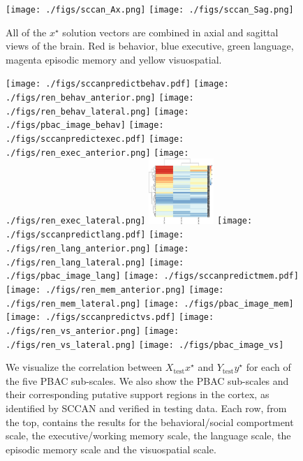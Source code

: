\documentclass[preprint,authoryear,12pt]{elsarticle}
\begin{document}
\begin{figure}[th] \centering
\texttt{[image: ./figs/sccan\_Ax.png]}
\texttt{[image: ./figs/sccan\_Sag.png]}
\caption{All of the $x^\star$ solution vectors are combined in axial and sagittal views of the brain.  Red is behavior, blue executive, green language, magenta episodic memory and yellow visuospatial.}
\label{fig:slices}
\end{figure}


\begin{figure}[th] \centering
\texttt{[image: ./figs/sccanpredictbehav.pdf]}
\texttt{[image: ./figs/ren\_behav\_anterior.png]}
\texttt{[image: ./figs/ren\_behav\_lateral.png]}
\texttt{[image: ./figs/pbac\_image\_behav]}
\texttt{[image: ./figs/sccanpredictexec.pdf]}
\texttt{[image: ./figs/ren\_exec\_anterior.png]}
\texttt{[image: ./figs/ren\_exec\_lateral.png]}
\includegraphics[width=0.22\textwidth]{./figs/pbac_image_exec}
\texttt{[image: ./figs/sccanpredictlang.pdf]}
\texttt{[image: ./figs/ren\_lang\_anterior.png]}
\texttt{[image: ./figs/ren\_lang\_lateral.png]}
\texttt{[image: ./figs/pbac\_image\_lang]}
\texttt{[image: ./figs/sccanpredictmem.pdf]}
\texttt{[image: ./figs/ren\_mem\_anterior.png]}
\texttt{[image: ./figs/ren\_mem\_lateral.png]}
\texttt{[image: ./figs/pbac\_image\_mem]}
\texttt{[image: ./figs/sccanpredictvs.pdf]}
\texttt{[image: ./figs/ren\_vs\_anterior.png]}
\texttt{[image: ./figs/ren\_vs\_lateral.png]}
\texttt{[image: ./figs/pbac\_image\_vs]}
\caption{We visualize the correlation between $X_\text{test} x^\star$ and $Y_\text{test} y^\star$ for each of the five PBAC sub-scales.  We also show the PBAC sub-scales and their corresponding putative support regions in the cortex, as identified by SCCAN and verified in testing data.
Each row, from the top, contains the results for the behavioral/social comportment scale, the executive/working memory scale, the language scale, the episodic memory scale and the visuospatial scale.}
\label{fig:test}
\end{figure}

\end{document}
